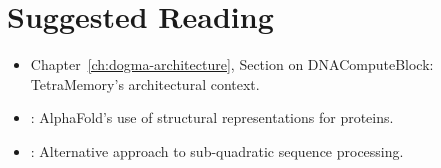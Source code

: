 \section*{Suggested Reading}
\begin{itemize}[leftmargin=1.5em]
  \item Chapter~\ref{ch:dogma-architecture}, Section on DNAComputeBlock:
        TetraMemory's architectural context.
  \item \citet{jumper2021}: AlphaFold's use of structural representations for
        proteins.
  \item \citet{gu2023mamba}: Alternative approach to sub-quadratic sequence
        processing.
\end{itemize}
